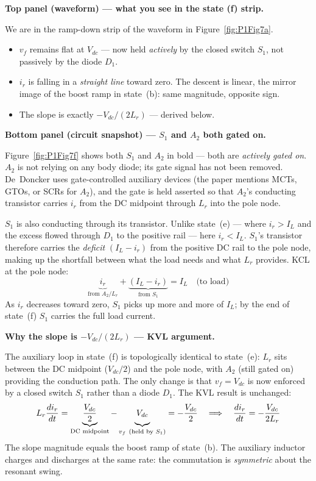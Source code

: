 \documentclass[12pt, a4paper]{article}
\def\,{ }%
\newcommand{\Vdc}{V_{dc}}
\newcommand{\vf}{v_f}
\newcommand{\ir}{i_r}
\newcommand{\IL}{I_L}
\newcommand{\Lr}{L_r}
\newcommand{\figref}[1]{Figure~\ref{#1}}
\begin{document}
\medskip
\textbf{Top panel (waveform) — what you see in the state\,(f) strip.}

We are in the ramp-down strip of the waveform in \figref{fig:P1Fig7a}.
\begin{itemize}
    \item $\vf$ remains flat at $\Vdc$ --- now held \emph{actively} by
          the closed switch $S_1$, not passively by the diode $D_1$.
    \item $\ir$ is falling in a \emph{straight line} toward zero.
          The descent is linear, the mirror image of the boost ramp in
          state~(b): same magnitude, opposite sign.
    \item The slope is exactly $-\Vdc/(2\Lr)$ --- derived below.
\end{itemize}

\medskip
\textbf{Bottom panel (circuit snapshot) --- $S_1$ and $A_2$ both gated on.}

\figref{fig:P1Fig7f} shows both $S_1$ and $A_2$ in bold --- both
are \emph{actively gated on}.
$A_2$ is not relying on any body diode; its gate signal has not been
removed.
De~Doncker uses gate-controlled auxiliary devices (the paper mentions
MCTs, GTOs, or SCRs for $A_2$), and the gate is held asserted so that
$A_2$'s conducting transistor carries $\ir$ from the DC midpoint through
$\Lr$ into the pole node.

$S_1$ is also conducting through its transistor.
Unlike state~(e) --- where $\ir > \IL$ and the excess flowed through $D_1$
to the positive rail --- here $\ir < \IL$.
$S_1$'s transistor therefore carries the \emph{deficit} $(\IL - \ir)$
from the positive DC rail to the pole node, making up the shortfall
between what the load needs and what $\Lr$ provides.
KCL at the pole node:
\begin{equation*}
    \underbrace{\ir}_{\text{from }A_2/\Lr}
    +
    \underbrace{(\IL - \ir)}_{\text{from }S_1}
    = \IL \quad \text{(to load)}
\end{equation*}
As $\ir$ decreases toward zero, $S_1$ picks up more and more of $\IL$;
by the end of state~(f) $S_1$ carries the full load current.

\medskip
\textbf{Why the slope is $-\Vdc/(2\Lr)$ --- KVL argument.}

The auxiliary loop in state~(f) is topologically identical to state~(e):
$\Lr$ sits between the DC midpoint ($\Vdc/2$) and the pole node, with
$A_2$ (still gated on) providing the conduction path.
The only change is that $\vf = \Vdc$ is now enforced by a closed switch
$S_1$ rather than a diode $D_1$.
The KVL result is unchanged:
\begin{equation}
    \Lr\,\frac{d\ir}{dt}
        = \underbrace{\frac{\Vdc}{2}}_{\text{DC midpoint}}
        - \underbrace{\Vdc\vphantom{\frac{\Vdc}{2}}}_{\vf\ (\text{held by }S_1)}
        = -\frac{\Vdc}{2}
    \quad\Longrightarrow\quad
    \frac{d\ir}{dt} = -\frac{\Vdc}{2\Lr}
    \label{eq:ir_ramp_statef}
\end{equation}
The slope magnitude equals the boost ramp of state~(b).
The auxiliary inductor charges and discharges at the same rate:
the commutation is \emph{symmetric} about the resonant swing.
\end{document}
